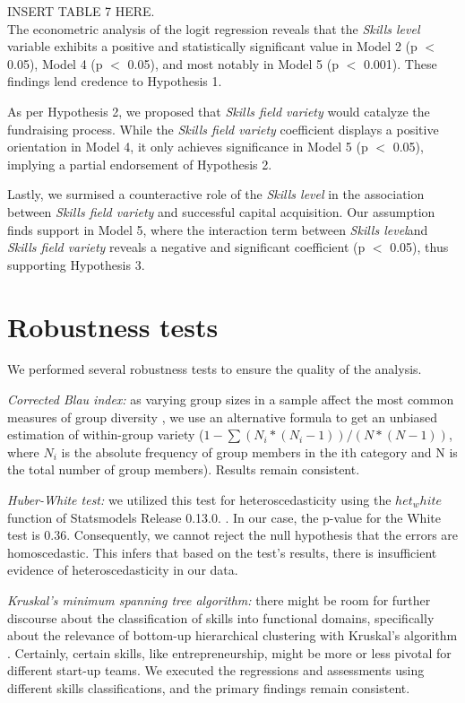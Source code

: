 \documentclass[12pt]{article}
\begin{document}
INSERT TABLE 7 HERE. \\

The econometric analysis of the logit regression reveals that the \textit{Skills level} variable exhibits a positive and statistically significant value in Model 2 (p $<$ 0.05), Model 4 (p $<$ 0.05), and most notably in Model 5 (p $<$ 0.001). These findings lend credence to Hypothesis 1.

As per Hypothesis 2, we proposed that \textit{Skills field variety} would catalyze the fundraising process. While the \textit{Skills field variety} coefficient displays a positive orientation in Model 4, it only achieves significance in Model 5 (p $<$ 0.05), implying a partial endorsement of Hypothesis 2.

Lastly, we surmised a counteractive role of the \textit{Skills level} in the association between \textit{Skills field variety} and successful capital acquisition. Our assumption finds support in Model 5, where the interaction term between \textit{Skills level}and \textit{Skills field variety} reveals a negative and significant coefficient (p $<$  0.05), thus supporting Hypothesis 3.

\section{Robustness tests}

We performed several robustness tests to ensure the quality of the analysis.

\textit{Corrected Blau index:} as varying group sizes in a sample affect the most common measures of group diversity \citep{biemann2010size}, we use an alternative formula to get an unbiased estimation of within-group variety ($1 - \sum(N_i*(N_i - 1))/(N*(N - 1))$, where $N_i$ is the absolute frequency of group members in the ith category and N is the total number of group members). Results remain consistent.

\textit{Huber-White test:} we utilized this test for heteroscedasticity using the $het_white$ function of Statsmodels Release 0.13.0. \citep{seabold2010statsmodels}. In our case, the p-value for the White test is 0.36. Consequently, we cannot reject the null hypothesis that the errors are homoscedastic. This infers that based on the test's results, there is insufficient evidence of heteroscedasticity in our data.

\textit{Kruskal's minimum spanning tree algorithm:} there might be room for further discourse about the classification of skills into functional domains, specifically about the relevance of bottom-up hierarchical clustering with Kruskal's algorithm \citep{kruskal1956shortest}. Certainly, certain skills, like entrepreneurship, might be more or less pivotal for different start-up teams. We executed the regressions and assessments using different skills classifications, and the primary findings remain consistent.
\end{document}
